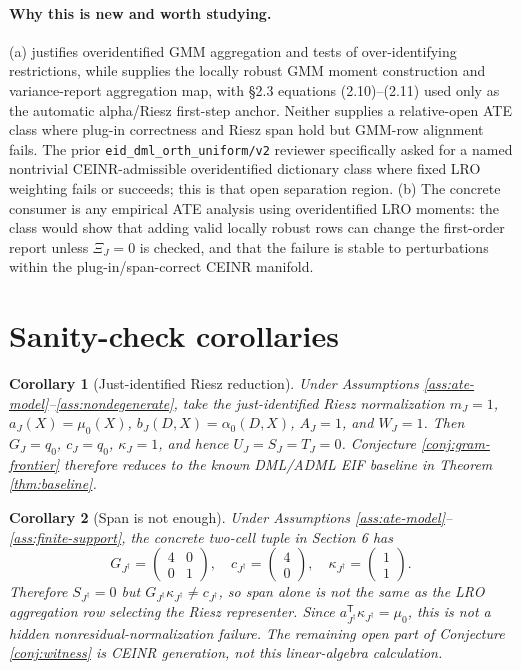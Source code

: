 \documentclass[11pt]{article}
\newcommand{\transpose}{\mathsf{T}}
\theoremstyle{definition}
\theoremstyle{plain}
\newtheorem{corollary}{Corollary}
\theoremstyle{remark}
\begin{document}
\paragraph{Why this is new and worth studying.}
(a) \citet[\S3--\S4]{Hansen1982Econometrica} justifies overidentified GMM
aggregation and tests of over-identifying restrictions, while
\citet[\S2, eqs.\ (2.2)--(2.3), and \S2, eq.\ (2.8)]{ChernozhukovEscancianoIchimuraNeweyRobins2022LRO}
supplies the locally robust GMM moment construction and variance-report
aggregation map, with \S2.3 equations (2.10)--(2.11) used only as the automatic
alpha/Riesz first-step anchor.  Neither supplies a
relative-open ATE class where plug-in correctness and Riesz span hold but
GMM-row alignment fails.  The prior
\texttt{eid\_dml\_orth\_uniform/v2} reviewer specifically asked for a named
nontrivial CEINR-admissible overidentified dictionary class where fixed LRO
weighting fails or succeeds; this is that open separation region.  (b) The concrete
consumer is any empirical ATE analysis using overidentified LRO moments: the
class would show that adding valid locally robust rows can change the
first-order report unless \(\Xi_J=0\) is checked, and that the failure is stable
to perturbations within the plug-in/span-correct CEINR manifold.

\section{Sanity-check corollaries}
\begin{corollary}[Just-identified Riesz reduction]\label{cor:riesz-reduction}
Under Assumptions \ref{ass:ate-model}--\ref{ass:nondegenerate}, take the
just-identified Riesz normalization \(m_J=1\),
\(a_J(X)=\mu_0(X)\), \(b_J(D,X)=\alpha_0(D,X)\), \(A_J=1\), and \(W_J=1\).
Then \(G_J=q_0\), \(c_J=q_0\), \(\kappa_J=1\), and hence
\(U_J=S_J=T_J=0\).  Conjecture \ref{conj:gram-frontier} therefore reduces to
the known DML/ADML EIF baseline in Theorem \ref{thm:baseline}.
\end{corollary}

\begin{corollary}[Span is not enough]\label{cor:span-not-enough}
Under Assumptions \ref{ass:ate-model}--\ref{ass:finite-support}, the concrete
two-cell tuple in Section 6 has
\[
G_{J^\dagger}=\begin{pmatrix}4&0\\0&1\end{pmatrix},\quad
c_{J^\dagger}=\begin{pmatrix}4\\0\end{pmatrix},\quad
\kappa_{J^\dagger}=\begin{pmatrix}1\\1\end{pmatrix}.
\]
Therefore \(S_{J^\dagger}=0\) but
\(G_{J^\dagger}\kappa_{J^\dagger}\ne c_{J^\dagger}\), so span alone is not the
same as the LRO aggregation row selecting the Riesz representer.  Since
\(a_{J^\dagger}^\transpose\kappa_{J^\dagger}=\mu_0\), this is not a hidden
nonresidual-normalization failure.  The remaining open part of Conjecture
\ref{conj:witness} is CEINR generation, not this linear-algebra calculation.
\end{corollary}
\end{document}
